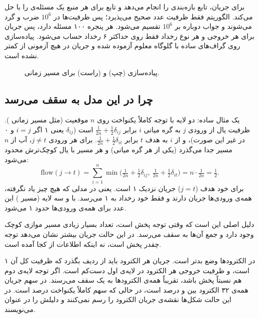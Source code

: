 برای جریان، تابع  بازه‌بندی را انجام می‌دهد و تابع  برای هر منبع یک مسئله‌ی  را با  حل می‌کند. الگوریتم  فقط ظرفیت عدد صحیح می‌پذیرد؛ پس ظرفیت‌ها در $10^{6}$ ضرب و گرد می‌شوند و جواب دوباره بر $10^{6}$ تقسیم می‌شود. هر پنجره ۱۰۰ مسئله دارد، پس جریان برای هر خروجی و هر نوع رخداد فقط روی حداکثر ۶ رخداد حساب می‌شود. پیاده‌سازی روی گراف‌های ساده با گلوگاه معلوم آزموده شده و جریان در هیچ آزمونی از  کمتر نشده است.

\begin{figure}[htbp]
\centering

\caption{پیاده‌سازی  (چپ) و  (راست) برای مسیر زمانی.}
\label{fig:rf-impl}
\end{figure}

\subsection{چرا  در این مدل به سقف می‌رسد}

یک مثال ساده: دو لایه با توجه کاملاً یکنواخت روی $n$ موقعیت (مثل مسیر زمانی ). ظرفیت یال از ورودی $j$ به گره میانی $i$ برابر $\tfrac{1}{2n}+\tfrac12\delta_{ij}$ است ($\delta_{ij}$ یعنی ۱ اگر $i=j$ و ۰ در غیر این صورت)، و از $i$ به هدف $t$ برابر $\tfrac{1}{2n}+\tfrac12\delta_{it}$. برای هر ورودی $j\ne t$، آب از $n$ مسیر جدا می‌گذرد (یکی از هر گره میانی) و هر مسیر با یال کوچک‌ترش محدود می‌شود:
\begin{equation}
\mathrm{flow}(j\to t)=\sum_{i=1}^{n}\min\!\Big(\tfrac{1}{2n}+\tfrac12\delta_{ij},\ \tfrac{1}{2n}+\tfrac12\delta_{it}\Big)=n\cdot\tfrac{1}{2n}=\tfrac12 .
\end{equation}
برای خود هدف ($j=t$) جریان نزدیک ۱ است. یعنی در مدلی که هیچ چیز یاد نگرفته، همه‌ی ورودی‌ها جریان  دارند و فقط  خود رخداد به ۱ می‌رسد. با  و سه لایه (مسیر ) این عدد برای همه‌ی ورودی‌ها حدود ۱ می‌شود.

دلیل اصلی این است که وقتی توجه پخش است، تعداد بسیار زیادی مسیر موازی کوچک وجود دارد و جمع آن‌ها به سقف می‌رسد. در این حالت جریان بیشتر نشان می‌دهد توجه چقدر پخش است، نه اینکه اطلاعات از کجا آمده است.

در الکترودها وضع بدتر است. جریان هر الکترود باید از ردیف  بگذرد که ظرفیت کل آن ۱ است، و ظرفیت خروجی هر الکترود در لایه‌ی اول دست‌کم  است. اگر توجه لایه‌ی دوم هم نسبتاً پخش باشد، تقریباً همه‌ی الکترودها به یک سقف می‌رسند. در  سهم جریان همه‌ی ۳۲ الکترود بین  و  درصد است، در حالی که سهم کاملاً یکنواخت  درصد است. در این حالت شکل‌ها نقشه‌ی جریان الکترود را رسم نمی‌کنند و دلیلش را در عنوان می‌نویسند.

